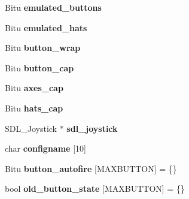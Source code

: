 \begin{DoxyCompactItemize}
\item 
\hypertarget{classCStickBindGroup_a51bea725a0cdafac1f0af7ce85241bea}{Bitu {\bfseries emulated\-\_\-buttons}}\label{classCStickBindGroup_a51bea725a0cdafac1f0af7ce85241bea}

\item 
\hypertarget{classCStickBindGroup_a0337c6069bcb3fd73597c33e33bf2451}{Bitu {\bfseries emulated\-\_\-hats}}\label{classCStickBindGroup_a0337c6069bcb3fd73597c33e33bf2451}

\item 
\hypertarget{classCStickBindGroup_a01f9966c343b6cc03a825dd7b6d3aa2f}{Bitu {\bfseries button\-\_\-wrap}}\label{classCStickBindGroup_a01f9966c343b6cc03a825dd7b6d3aa2f}

\item 
\hypertarget{classCStickBindGroup_afa2636c5e839bdfa507214390e88739a}{Bitu {\bfseries button\-\_\-cap}}\label{classCStickBindGroup_afa2636c5e839bdfa507214390e88739a}

\item 
\hypertarget{classCStickBindGroup_a902cd5277a0c67586acf999340852a8c}{Bitu {\bfseries axes\-\_\-cap}}\label{classCStickBindGroup_a902cd5277a0c67586acf999340852a8c}

\item 
\hypertarget{classCStickBindGroup_afc6609160872cd27fb78b984a28414ec}{Bitu {\bfseries hats\-\_\-cap}}\label{classCStickBindGroup_afc6609160872cd27fb78b984a28414ec}

\item 
\hypertarget{classCStickBindGroup_ab4a8851b19677cb8d894e0dfe99e60f9}{S\-D\-L\-\_\-\-Joystick $\ast$ {\bfseries sdl\-\_\-joystick}}\label{classCStickBindGroup_ab4a8851b19677cb8d894e0dfe99e60f9}

\item 
\hypertarget{classCStickBindGroup_ae12e74e64e04a46968d6f32469065ea9}{char {\bfseries configname} \mbox{[}10\mbox{]}}\label{classCStickBindGroup_ae12e74e64e04a46968d6f32469065ea9}

\item 
\hypertarget{classCStickBindGroup_a0389a0b42ba3f469fce030708ff507fc}{Bitu {\bfseries button\-\_\-autofire} \mbox{[}M\-A\-X\-B\-U\-T\-T\-O\-N\mbox{]} = \{\}}\label{classCStickBindGroup_a0389a0b42ba3f469fce030708ff507fc}

\item 
\hypertarget{classCStickBindGroup_a96c43a605b492b037f18490fb75be8a1}{bool {\bfseries old\-\_\-button\-\_\-state} \mbox{[}M\-A\-X\-B\-U\-T\-T\-O\-N\mbox{]} = \{\}}\label{classCStickBindGroup_a96c43a605b492b037f18490fb75be8a1}


\end{DoxyCompactItemize}
